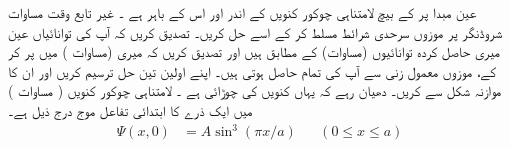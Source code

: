 عین مبدا پر  کے بیچ لامتناہی چوکور کنویں  کے اندر اور اس کے باہر ہے ۔ غیر تابع وقت مساوات شروڈنگر پر موزوں سرحدی شرائط مسلط کر کے اسے حل کریں۔ تصدیق کریں کہ آپ کی توانائیاں عین میری حاصل کردہ توانائیوں (مساوات) کے مطابق ہیں  اور تصدیق کریں کہ میری  (مساوات ) میں  پر کر کے، موزوں معمول زنی سے آپ کی تمام  حاصل ہوتی ہیں۔ اپنے اولین تین حل ترسیم کریں اور ان کا موازنہ شکل  سے کریں۔ دھیان رہے کہ یہاں کنویں  کی چوڑائی  ہے ۔ 
 لامتناہی چوکور کنویں ( مساوات ) میں ایک ذرے کا ابتدائی تفاعل موج درج ذیل ہے۔
 \begin{align*}
 \Psi(x,0)&=A\sin^{3}(\pi x/a) && (0\le x\le a)
\end{align*}

